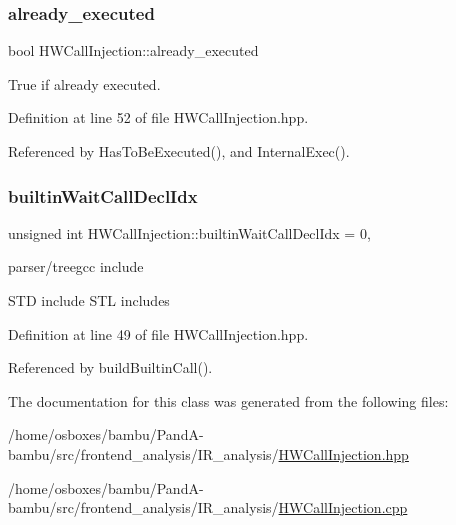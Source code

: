 \subsubsection{\texorpdfstring{already\+\_\+executed}{already\_executed}}
{\footnotesize\ttfamily bool H\+W\+Call\+Injection\+::already\+\_\+executed\hspace{0.3cm}{\ttfamily [private]}}



True if already executed. 



Definition at line 52 of file H\+W\+Call\+Injection.\+hpp.



Referenced by Has\+To\+Be\+Executed(), and Internal\+Exec().

\mbox{\label{classHWCallInjection_af931a33b0365ab1d8feb625f6f24b5b5}} 
\subsubsection{\texorpdfstring{builtin\+Wait\+Call\+Decl\+Idx}{builtinWaitCallDeclIdx}}
{\footnotesize\ttfamily unsigned int H\+W\+Call\+Injection\+::builtin\+Wait\+Call\+Decl\+Idx = 0\hspace{0.3cm}{\ttfamily [static]}, {\ttfamily [private]}}



parser/treegcc include 

S\+TD include S\+TL includes 

Definition at line 49 of file H\+W\+Call\+Injection.\+hpp.



Referenced by build\+Builtin\+Call().



The documentation for this class was generated from the following files\+:\begin{DoxyCompactItemize}
\item 
/home/osboxes/bambu/\+Pand\+A-\/bambu/src/frontend\+\_\+analysis/\+I\+R\+\_\+analysis/\hyperlink{HWCallInjection_8hpp}{H\+W\+Call\+Injection.\+hpp}\item 
/home/osboxes/bambu/\+Pand\+A-\/bambu/src/frontend\+\_\+analysis/\+I\+R\+\_\+analysis/\hyperlink{HWCallInjection_8cpp}{H\+W\+Call\+Injection.\+cpp}\end{DoxyCompactItemize}
